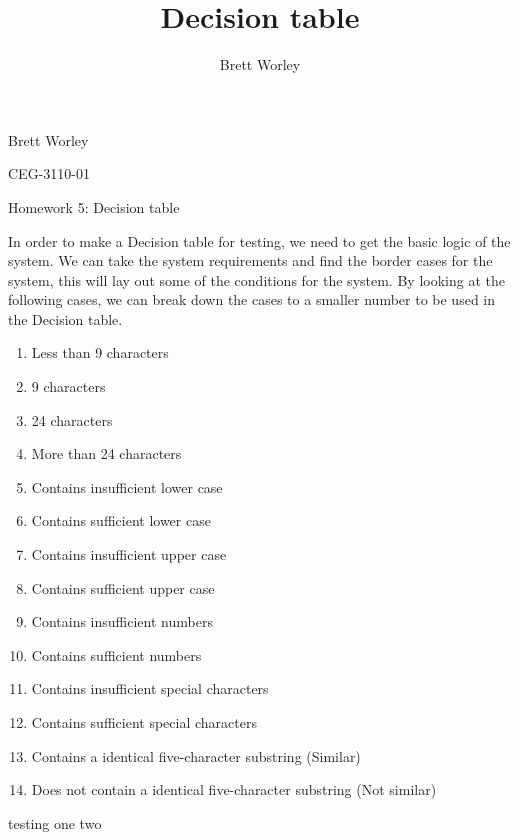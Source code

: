 \documentclass[12pt,letterpaper]{article}
\author{Brett Worley}
\title{Decision table}
\begin{document}
Brett Worley

CEG-3110-01

\centerline{ Homework 5: Decision table}

In order to make a Decision table for testing, we need to get the basic logic of the system. We can take the system requirements and 
find the border cases for the system, this will lay out some of the conditions for
the system. By looking at the following cases, we can break down the cases to a smaller number
to be used in the Decision table.

\begin{enumerate}
\item Less than 9 characters
\item 9 characters
\item 24 characters
\item More than 24 characters
\item Contains insufficient lower case
\item Contains sufficient lower case
\item Contains insufficient upper case
\item Contains sufficient upper case
\item Contains insufficient numbers
\item Contains sufficient numbers
\item Contains insufficient special characters
\item Contains sufficient special characters
\item Contains a identical five-character substring (Similar)
\item Does not contain a identical five-character substring (Not similar)
\end{enumerate}

testing one two
\end{document}
